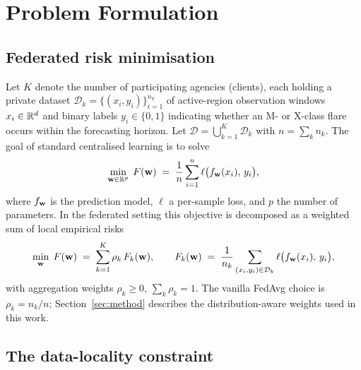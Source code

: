 \section{Problem Formulation}\label{sec:problem}

\subsection{Federated risk minimisation}

Let $K$ denote the number of participating agencies (clients), each
holding a private dataset
$\mathcal{D}_k = \{(x_i, y_i)\}_{i=1}^{n_k}$ of active-region
observation windows $x_i \in \mathbb{R}^{d}$ and binary labels
$y_i \in \{0,1\}$ indicating whether an M- or X-class flare occurs
within the forecasting horizon. Let
$\mathcal{D} = \bigcup_{k=1}^{K} \mathcal{D}_k$ with
$n = \sum_k n_k$. The goal of standard centralised learning is to
solve
\begin{equation}\label{eq:central}
    \min_{\mathbf{w} \in \mathbb{R}^{p}} \;
    F(\mathbf{w}) \;=\; \frac{1}{n}\sum_{i=1}^{n}
    \ell\big(f_{\mathbf{w}}(x_i),\, y_i\big),
\end{equation}
where $f_{\mathbf{w}}$ is the prediction model, $\ell$ a per-sample loss, and
$p$ the number of parameters. In the federated setting this objective
is decomposed as a weighted sum of local empirical risks
\begin{equation}\label{eq:fedobj}
    \min_{\mathbf{w}} \; F(\mathbf{w}) \;=\; \sum_{k=1}^{K} \rho_k \, F_k(\mathbf{w}),
    \qquad
    F_k(\mathbf{w}) \;=\; \frac{1}{n_k}\sum_{(x_i,y_i)\in\mathcal{D}_k}
    \ell\big(f_{\mathbf{w}}(x_i),\, y_i\big),
\end{equation}
with aggregation weights $\rho_k \ge 0$, $\sum_k \rho_k = 1$. The
vanilla FedAvg choice is $\rho_k = n_k / n$; Section~\ref{sec:method}
describes the distribution-aware weights used in this work.

\subsection{The data-locality constraint}


